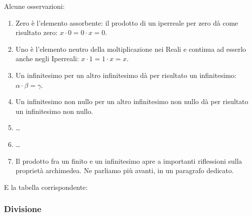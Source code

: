 \begin{multicols}{2}
Alcune osservazioni:
\begin{enumerate} [noitemsep]
 \item Zero è l'elemento assorbente: il prodotto di un iperreale per zero
dà come risultato zero: $x \cdot 0=0 \cdot x=0$.
 \item Uno è l'elemento neutro della moltiplicazione nei Reali e continua ad 
esserlo anche negli Iperreali: $x \cdot 1=1 \cdot x=x$.
 \item Un infinitesimo per un altro infinitesimo dà per risultato un 
infinitesimo: $\alpha \cdot \beta=\gamma$.
 \item Un infinitesimo non nullo per un altro infinitesimo non nullo dà 
per risultato un infinitesimo non nullo.
 \item \dots
 \item \dots
 \item Il prodotto fra un finito e un infinitesimo apre a importanti 
riflessioni
sulla proprietà archimedea. Ne parliamo più avanti, in un paragrafo dedicato.
 \end{enumerate}
E la tabella corrispondente:
\begin{center}
\renewcommand{\arraystretch}{.0}
\end{center}
\end{multicols}

\subsubsection{Divisione}
\label{subsec:insnum_divisione}

